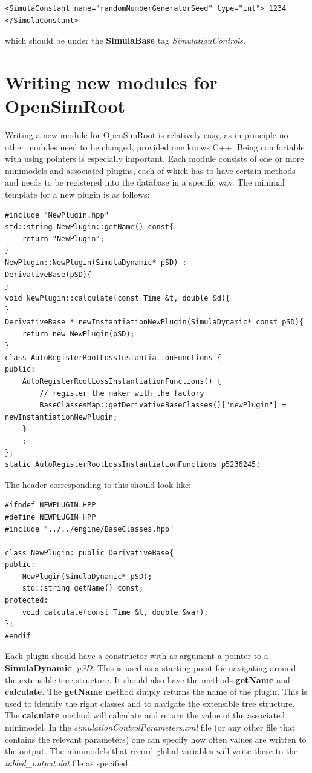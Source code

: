 \documentclass{article}
\begin{document}
\begin{verbatim}
<SimulaConstant name="randomNumberGeneratorSeed" type="int"> 1234	</SimulaConstant>
\end{verbatim}

\noindent which should be under the \textbf{SimulaBase} tag \textit{SimulationControls}.
\section{Writing new modules for OpenSimRoot}\label{Writing}

\noindent Writing a new module for OpenSimRoot is relatively easy, as in principle no other modules need to be changed, provided one knows C++. Being comfortable with using pointers is especially important. Each module consists of one or more minimodels and associated plugins, each of which has to have certain methods and needs to be registered into the database in a specific way. The minimal template for a new plugin is as follows:

\lstset{language=c++}
\begin{lstlisting}
#include "NewPlugin.hpp"
std::string NewPlugin::getName() const{
	return "NewPlugin";
}
NewPlugin::NewPlugin(SimulaDynamic* pSD) :
DerivativeBase(pSD){
}
void NewPlugin::calculate(const Time &t, double &d){
}
DerivativeBase * newInstantiationNewPlugin(SimulaDynamic* const pSD){
	return new NewPlugin(pSD);
}
class AutoRegisterRootLossInstantiationFunctions {
public:
	AutoRegisterRootLossInstantiationFunctions() {
		// register the maker with the factory
		BaseClassesMap::getDerivativeBaseClasses()["newPlugin"] = newInstantiationNewPlugin;
	}
	;
};
static AutoRegisterRootLossInstantiationFunctions p5236245;
\end{lstlisting}

\noindent The header corresponding to this should look like:

\begin{lstlisting}
#ifndef NEWPLUGIN_HPP_
#define NEWPLUGIN_HPP_
#include "../../engine/BaseClasses.hpp"

class NewPlugin: public DerivativeBase{
public:
	NewPlugin(SimulaDynamic* pSD);
	std::string getName() const;
protected:
	void calculate(const Time &t, double &var);
};
#endif
\end{lstlisting}

\noindent Each plugin should have a constructor with as argument a pointer to a \textbf{SimulaDynamic}, \textit{pSD}. This is used as a starting point for navigating around the extensible tree structure. It should also have the methods \textbf{getName} and \textbf{calculate}. The \textbf{getName} method simply returns the name of the plugin. This is used to identify the right classes and to navigate the extensible tree structure. The \textbf{calculate} method will calculate and return the value of the associated minimodel. In the \textit{simulationControlParameters.xml} file (or any other file that contains the relevant parameters) one can specify how often values are written to the output. The minimodels that record global variables will write these to the \textit{tabled\_output.dat} file as specified. \newline
\end{document}
